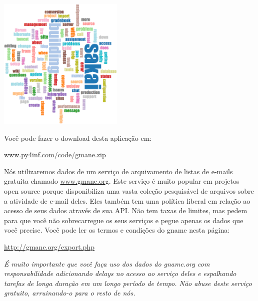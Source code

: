 \beforefig
\centerline{\includegraphics[height=2.50in]{figs2/wordcloud.eps}}
\afterfig

Você pode fazer o download desta aplicação em:

\url{www.py4inf.com/code/gmane.zip}

Nós utilizaremos dados de um serviço de arquivamento de listas de e-mails
gratuita chamado \url{www.gmane.org}. Este serviço é muito popular em projetos
open source porque disponibiliza uma vasta coleção pesquisável de arquivos sobre
a atividade de e-mail deles. Eles também tem uma política liberal em relação
ao acesso de seus dados através de sua API. Não tem taxas de limites, mas pedem
para que você não sobrecarregue os seus serviços e pegue apenas os dados
que você precise. Você pode ler os termos e condições do gname nesta página:

\url{http://gmane.org/export.php}

{\em É muito importante que você faça uso dos dados do gname.org com
responsabilidade adicionando delays no acesso ao serviço deles e 
espalhando tarefas de longa duração em um longo período de tempo.
Não abuse deste serviço gratuito, arruinando-o para o resto de nós.}

